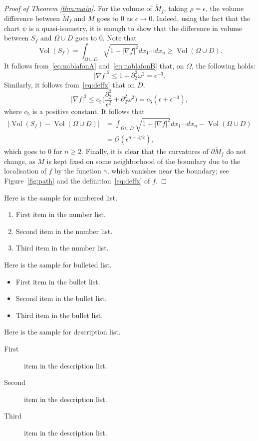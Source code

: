 \documentclass{CUP-JNL-FMP}%
\theoremstyle{definition}
\numberwithin{equation}{section}
\begin{document}
\begin{proof}[Proof of Theorem \ref{thm:main}]
For the volume of $\widetilde{M}_f$, taking $\rho = \epsilon$, the volume difference between
$\widetilde{M}_f$ and $M$ goes to 0 as $\epsilon \to 0$.
Indeed, using the fact that the chart $\psi$ is
a quasi-isometry, it is enough to show that the difference in volume between $S_f$ and
$\Omega \cup D$ goes to 0. Note that
$$
\mathop{\mbox{Vol}}(S_f)= \int_{\Omega \cup D}
\sqrt{1 + |\nabla f|^2} dx_1 \cdots dx_n\geq  \mathop{\mbox{Vol}}(\Omega \cup D).
$$
It follows from~\eqref{eq:nablafonA} and~\eqref{eq:nablafonB} that, on $\Omega$, the following holds:
$$|\nabla f|^2\leq1+\partial_2^2\omega^2=\epsilon^{-3}.$$
Similarly, it follows from~\eqref{eq:deffx} that on $D$, $$
|\nabla f|^2\leq c_5\Big(\frac{\partial_2^2}{\epsilon^2}+\partial_2^2\omega^2\Big)=c_5(\epsilon+\epsilon^{-3}),
$$
where $c_5$ is a positive constant.
It follows that
\begin{align*}
  |\mathop{\mbox{Vol}}(S_f) - \mathop{\mbox{Vol}}(\Omega \cup D)| &= \int_{\Omega \cup D}
  \sqrt{1 + |\nabla f|^2} dx_1 \cdots dx_n  - \mathop{\mbox{Vol}}(\Omega \cup D)\\
  &= \mathcal{O}(\epsilon^{n-3/2}),
\end{align*}
which goes to 0 for $n \geq 2$. Finally, it is clear that the curvatures of
$\partial \widetilde{M}_f$ do not change, as $M$ is kept fixed on some neighborhood
of the boundary due to the localisation of $f$ by the function $\gamma$, which vanishes near the boundary; see Figure~\ref{fig:path} and the definition~\eqref{eq:deffx} of $f$.
\end{proof}

\noindent Here is the sample for numbered list.
\begin{enumerate}
\item First item in the number list.
\item Second item in the number list.
\item Third item in the number list.
\end{enumerate}
Here is the sample for bulleted list.
\begin{itemize}
\item First item in the bullet list.
\item Second item in the bullet list.
\item Third item in the bullet list.
\end{itemize}
Here is the sample for description list.
\begin{description}
\item[First] item in the description list.
\item[Second] item in the description list.
\item[Third] item in the description list.
\end{description}
\end{document}
